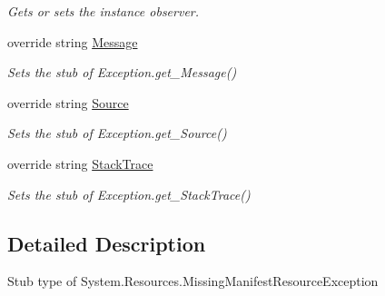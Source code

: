 \begin{DoxyCompactItemize}
\begin{DoxyCompactList}\small\item\em Gets or sets the instance observer.\end{DoxyCompactList}\item 
override string \hyperlink{class_system_1_1_resources_1_1_fakes_1_1_stub_missing_manifest_resource_exception_a1623871ba8151b2ec7aba00af613ae92}{Message}
\begin{DoxyCompactList}\small\item\em Sets the stub of Exception.\-get\-\_\-\-Message()\end{DoxyCompactList}\item 
override string \hyperlink{class_system_1_1_resources_1_1_fakes_1_1_stub_missing_manifest_resource_exception_a1e3c0e1b9d485014f923baece22e1a57}{Source}
\begin{DoxyCompactList}\small\item\em Sets the stub of Exception.\-get\-\_\-\-Source()\end{DoxyCompactList}\item 
override string \hyperlink{class_system_1_1_resources_1_1_fakes_1_1_stub_missing_manifest_resource_exception_aa5f9312f108e4845f288b31003f55225}{Stack\-Trace}
\begin{DoxyCompactList}\small\item\em Sets the stub of Exception.\-get\-\_\-\-Stack\-Trace()\end{DoxyCompactList}\end{DoxyCompactItemize}


\subsection{Detailed Description}
Stub type of System.\-Resources.\-Missing\-Manifest\-Resource\-Exception



